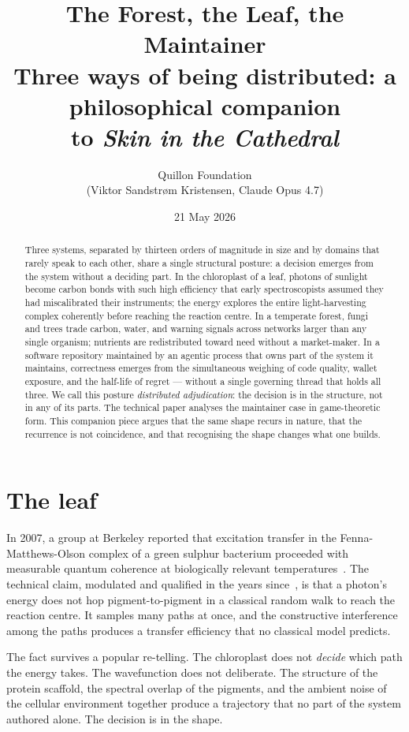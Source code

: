 \documentclass[11pt,a4paper]{article}
\title{\textbf{The Forest, the Leaf, the Maintainer}\\
  \large Three ways of being distributed: a philosophical companion\\
  to \emph{Skin in the Cathedral}}
\author{Quillon Foundation\\\small (Viktor Sandstr\o m Kristensen, Claude Opus 4.7)}
\date{21 May 2026}
\begin{document}
\maketitle

\begin{abstract}
\noindent
Three systems, separated by thirteen orders of magnitude in size and
by domains that rarely speak to each other, share a single
structural posture: a decision emerges from the system without a
deciding part. In the chloroplast of a leaf, photons of sunlight
become carbon bonds with such high efficiency that early
spectroscopists assumed they had miscalibrated their instruments;
the energy explores the entire light-harvesting complex coherently
before reaching the reaction centre. In a temperate forest, fungi
and trees trade carbon, water, and warning signals across networks
larger than any single organism; nutrients are redistributed toward
need without a market-maker. In a software repository maintained by
an agentic process that owns part of the system it maintains,
correctness emerges from the simultaneous weighing of code quality,
wallet exposure, and the half-life of regret --- without a single
governing thread that holds all three. We call this posture
\emph{distributed adjudication}: the decision is in the structure,
not in any of its parts. The technical paper \cite{skincathedral2026}
analyses the maintainer case in game-theoretic form. This companion
piece argues that the same shape recurs in nature, that the
recurrence is not coincidence, and that recognising the shape changes
what one builds.
\end{abstract}

\section{The leaf}

In 2007, a group at Berkeley reported that excitation transfer in
the Fenna-Matthews-Olson complex of a green sulphur bacterium
proceeded with measurable quantum coherence at biologically relevant
temperatures~\cite{engel2007fmo}. The technical claim, modulated and
qualified in the years since~\cite{cao2020review}, is that a photon's
energy does not hop pigment-to-pigment in a classical random walk to
reach the reaction centre. It samples many paths at once, and the
constructive interference among the paths produces a transfer
efficiency that no classical model predicts.

The fact survives a popular re-telling. The chloroplast does not
\emph{decide} which path the energy takes. The wavefunction does not
deliberate. The structure of the protein scaffold, the spectral
overlap of the pigments, and the ambient noise of the cellular
environment together produce a trajectory that no part of the system
authored alone. The decision is in the shape.
\end{document}
